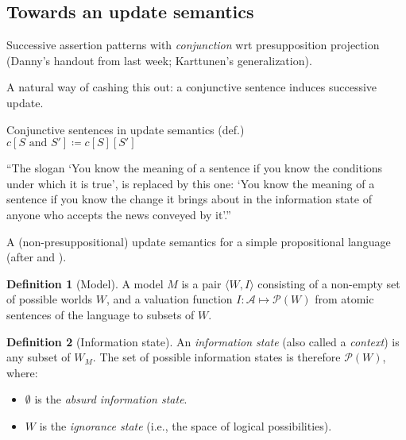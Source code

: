 \documentclass[nols,twoside,nofonts,nobib,nohyper]{tufte-handout}
\theoremstyle{definition}
\newtheorem{definition}{Definition}[section]
\begin{document}
\subsection{Towards an update semantics}

Successive assertion patterns with \textit{conjunction} wrt presupposition projection (Danny's handout from last week; Karttunen's generalization).

A natural way of cashing this out: a conjunctive sentence induces successive update.

\ex Conjunctive sentences in update semantics (def.)\\
$c[S\text{ and }S'] ≔ c[S][S']$
\xe

\begin{displayquote}
\enquote{The slogan `You know the meaning of a sentence if you know the conditions under which it is true', is replaced by this one: `You know the meaning of a sentence if you know the change it brings about in the information state of anyone who accepts the news conveyed by it'.}
\end{displayquote}

A (non-presuppositional) update semantics for a simple propositional language (after \citealt{Veltman1996} and \citealt{Heim1983}).



\begin{definition}[Model]
A model $M$ is a pair $⟨W,I⟩$ consisting of a non-empty set of possible worlds $W$, and a valuation function $I:\mathscr{A} ↦ \mathscr{P}(W)$ from atomic sentences of the language to subsets of $W$.
\end{definition}

\begin{definition}[Information state]
  An \textit{information state} (also called a \textit{context}) is any subset of $W_{M}$. The set of possible information states is therefore $\mathscr{P}(W)$, where:
  \begin{itemize}
      \item $∅$ is the \textit{absurd information state}.
      \item $W$ is the \textit{ignorance state} (i.e., the space of logical possibilities).
  \end{itemize}
\end{definition}
\end{document}
